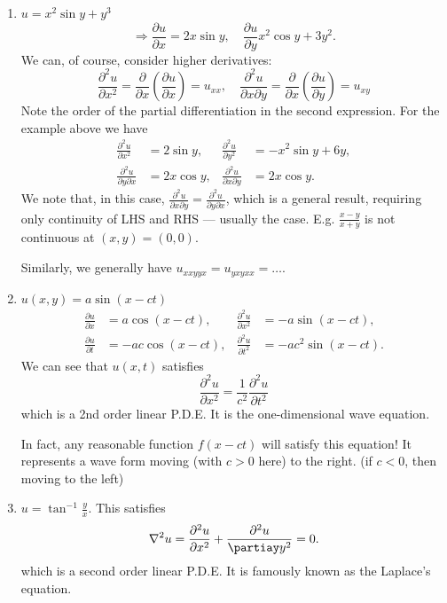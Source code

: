 \documentclass[12pt]{report}
\theoremstyle{definition}
\begin{document}
\begin{enumerate}[label = (\roman*)]
    \item $u = x^{2}\sin{y} + y^{3}$\[
        \Rightarrow{}\frac{\partial u}{\partial x} = 2x\sin{y},\quad
        \frac{\partial u}{\partial y} x^{2}\cos{y} + 3y^{2}.
    \]
    We can, of course, consider higher derivatives:\[
        \frac{\partial^{2}u}{\partial x^{2}} 
        = \frac{\partial }{\partial x} \left(\frac{\partial u}{\partial x} \right) 
        = u_{xx}, \quad
        \frac{\partial^{2}u}{\partial x \partial y} 
        = \frac{\partial}{\partial x} \left(\frac{\partial u}{\partial y} \right) 
        = u_{xy}
    \]
    Note the order of the partial differentiation in the second expression.
    For the example above we have\[
        \begin{align*}
            \frac{\partial^{2}u}{\partial x^{2}} & = 2\sin{y}, & \frac{\partial^{2}u}{\partial y^{2}} & = -x^{2}\sin{y} + 6y, \\ 
            \frac{\partial^{2}u}{\partial y \partial x} & = 2x\cos{y}, & \frac{\partial^{2}u}{\partial x \partial y} & = 2x\cos{y}.
        \end{align*}
    \]
    We note that, in this case, $\frac{\partial^{2}u}{\partial x \partial y}
    = \frac{\partial^{2}u}{\partial y \partial x} $, which is a general result,
    requiring only continuity of LHS and RHS --- usually the case.
    E.g. $\frac{x-y}{x+y}$ is not continuous at $(x,y) = (0,0)$.

    Similarly, we generally have $u_{xxyyx} = u_{yxyxx} = \ldots$.

\item $u(x,y) = a\sin{(x - ct)}$\[
    \begin{align*}
        \frac{\partial u}{\partial x} & = a\cos{(x-ct)}, & \frac{\partial^{2}u}{\partial x^{2}} & = -a\sin{(x-ct)}, \\
        \frac{\partial u}{\partial t} & = -ac\cos{(x-ct)}, & \frac{\partial^{2}u}{\partial t^{2}} & = -ac^{2}\sin{(x-ct)}.
    \end{align*}
\]
We can see that $u(x,t)$ satisfies\[
    \frac{\partial^{2}u}{\partial x^{2}} = \frac{1}{c^{2}} \frac{\partial^{2}u}{\partial t^{2}} 
\]which is a 2nd order linear P.D.E.
It is the one-dimensional wave equation.

In fact, any reasonable function $f(x-ct)$ will satisfy this equation!
It represents a wave form moving (with $c>0$ here) to the right.
(if $c<0$, then moving to the left)

\item $u = \tan^{-1}{\frac{y}{x}}$.
    This satisfies\[
        \nabla^{2} u = \frac{\partial^{2}u}{\partial x^{2}} + \frac{\partial^{2}u}{\partiay y^{2}} = 0.
    \]which is a second order linear P.D.E.
    It is famously known as the Laplace's equation.
\end{enumerate}
\end{document}
